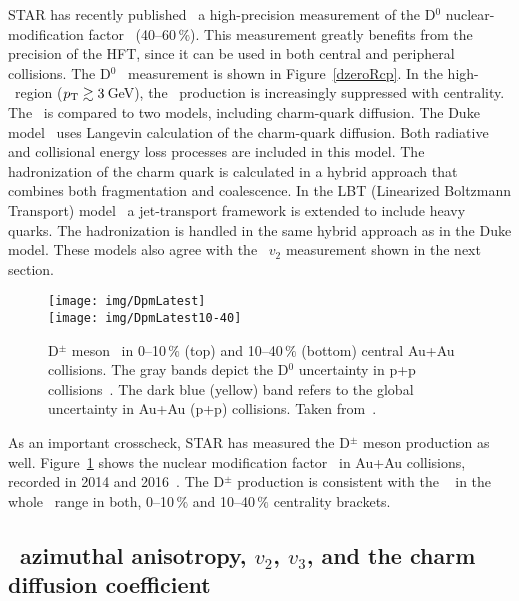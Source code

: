 STAR has recently published~\cite{D0paper} a high-precision measurement of the D$^0$  nuclear-modification factor \Rcp\ (40--60$\,\%$)\@. This measurement greatly benefits from the precision of the HFT, since it can be used in both central and peripheral collisions.
The D$^0$ \Rcp\ measurement is shown in Figure~\ref{dzeroRcp}. In the high-\pt\ region (${p_{\mathrm{T}}} \gtrsim 3\,$GeV), the \dzero\ production is increasingly suppressed with centrality. The \Rcp\ is compared to two models, including charm-quark diffusion. The Duke model~\cite{Duke, Duke2015} uses Langevin calculation of the charm-quark diffusion. Both radiative and collisional energy loss processes are included in this model. The hadronization of the charm quark is calculated in a hybrid approach that combines both fragmentation and coalescence. In the LBT (Linearized Boltzmann Transport) model~\cite{LBT, LBTprivate} a jet-transport framework is extended to include heavy quarks. The hadronization is handled in the same hybrid approach as in the Duke model. These models also agree with the \dzero\ $v_2$ measurement shown in the next section.


\begin{figure}[!htb]
\begin{center}
 \texttt{[image: img/DpmLatest]}\\
 \texttt{[image: img/DpmLatest10-40]}\\
\end{center}
\caption[D$^\pm$ meson \Raa\ in 0--10$\,\%$ and 10--40$\,\%$ central Au+Au collisions.]{\label{dpm} D$^\pm$ meson \Raa\ in 0--10$\,\%$ (top) and 10--40$\,\%$ (bottom) central Au+Au collisions. The gray bands depict the D$^0$ uncertainty in p+p collisions~\cite{flashTalkICHEPVanek,D0paper}. The dark blue (yellow) band refers to the global uncertainty in Au+Au (p+p) collisions. Taken from~\cite{flashTalkICHEPVanek}\@.}
\end{figure}


As an important crosscheck, STAR has measured the D$^\pm$ meson production as well. Figure~\ref{dpm} shows the nuclear modification factor \Raa\ in Au+Au collisions, recorded in 2014 and 2016~\cite{flashTalkICHEPVanek}\@. The D$^\pm$ production is consistent with the \dzero~\cite{D0paper} in the whole \pt\ range in both, 0--10$\,\%$ and 10--40$\,\%$ centrality brackets.

\subsection{\dzero\ azimuthal anisotropy, $v_2$, $v_3$, and the charm diffusion coefficient}

